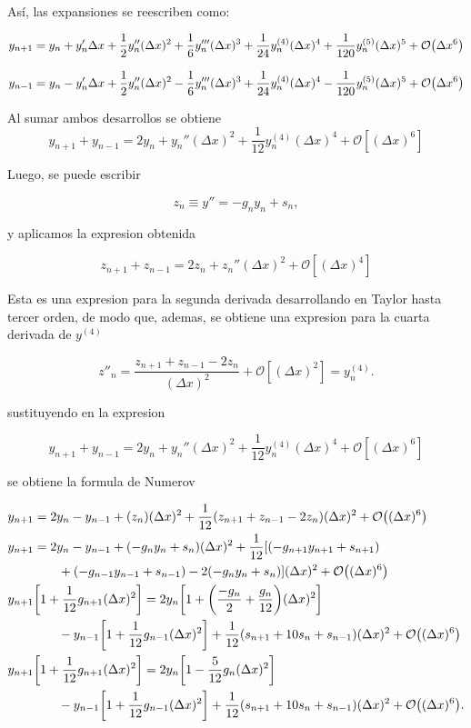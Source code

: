 \documentclass[11pt]{article}
\begin{document}
Así, las expansiones se reescriben como:

\[ y_{n+1} = y_n + y_n' \Delta x + \frac{1}{2} y_n'' (\Delta x)^2 + \frac{1}{6} y_n''' (\Delta x)^3 + \frac{1}{24} y_n^{(4)} (\Delta x)^4 + \frac{1}{120} y_n^{(5)} (\Delta x)^5 + \order{\Delta x^6} \]

\[ y_{n-1} = y_n - y_n' \Delta x + \frac{1}{2} y_n'' (\Delta x)^2 - \frac{1}{6} y_n''' (\Delta x)^3 + \frac{1}{24} y_n^{(4)} (\Delta x)^4 - \frac{1}{120} y_n^{(5)} (\Delta x)^5 + \order{\Delta x^6} \]

Al sumar ambos desarrollos se obtiene
\[ y_{n+1} + y_{n-1} = 2y_n + y_n''(\Delta x)^2 + \frac{1}{12} y_n^{(4)} (\Delta x)^4 + \mathcal{O} [(\Delta x)^6] \]

Luego, se puede escribir

\[ z_n \equiv y'' = - g_ny_n + s_n, \]

y aplicamos la expresion obtenida

\[ z_{n+1} + z_{n-1} = 2z_n + z_n'' (\Delta x)^2 + \mathcal{O}[(\Delta x)^4] \]

Esta es una expresion para la segunda derivada desarrollando en Taylor hasta tercer orden, de modo que, ademas, se obtiene una expresion para la cuarta derivada de \(y^{(4)}\)

\[ z''_n = \frac{z_{n+1}+z_{n-1}-2z_n}{(\Delta x)^2} + \mathcal{O}[(\Delta x)^2] = y_n^{(4)}. \]

sustituyendo en la expresion

\[ y_{n+1} + y_{n-1} = 2y_n + y_n''(\Delta x)^2 + \frac{1}{12} y_n^{(4)} (\Delta x)^4 + \mathcal{O} [(\Delta x)^6] \]

se obtiene la formula de Numerov

 \begin{align*}
  &y_{n+1} = 2y_n - y_{n-1} + (z_n)(\Delta x)^2 + \frac{1}{12}(z_{n+1}+z_{n-1}-2z_n)(\Delta x)^2 + \order{(\Delta x)^6} \\
  &y_{n+1} =  2y_n -y_{n-1} + (-g_ny_n + s_n) (\Delta x)^2 + \frac{1}{12} [(-g_{n+1}y_{n+1}+s_{n+1}) \\
  & \qq{}\qq{} +(-g_{n-1}y_{n-1}+s_{n-1})-2(-g_ny_n+s_n)](\Delta x)^2 + \order{(\Delta x)^6} \\
  &y_{n+1}\qty[1 + \frac{1}{12}g_{n+1}(\Delta x)^2] = 2y_n \qty[1+\qty(\frac{-g_n}{2}+\frac{g_n}{12})(\Delta x)^2] \\
  & \qq{}\qq{} - y_{n-1}\qty[1+\frac{1}{12}g_{n-1}(\Delta x)^2] + \frac{1}{12}(s_{n+1}+10s_n+s_{n-1})(\Delta x)^2 + \order{(\Delta x)^6} \\
  &y_{n+1}\qty[1 + \frac{1}{12}g_{n+1}(\Delta x)^2] = 2y_n \qty[1-\frac{5}{12}g_n(\Delta x)^2] \\
  & \qq{}\qq{} -y_{n-1}\qty[1+\frac{1}{12}g_{n-1}(\Delta x)^2] + \frac{1}{12}(s_{n+1}+10s_n+s_{n-1})(\Delta x)^2 + \order{(\Delta x)^6}.
\end{align*}
\end{document}
